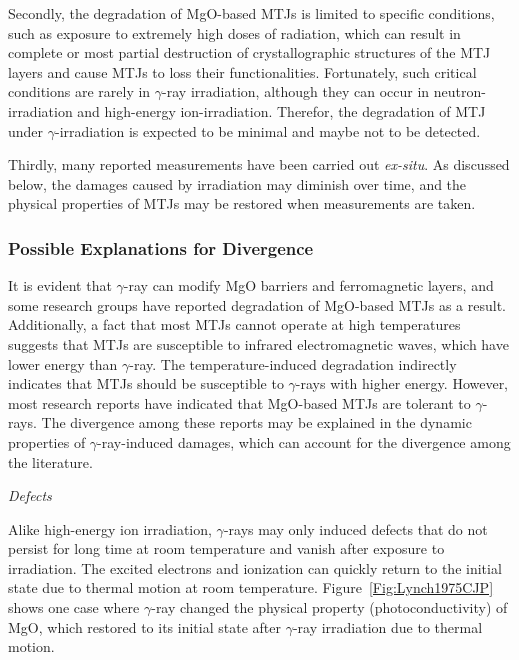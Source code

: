 \documentclass[molecules,review,submit,pdftex,moreauthors]{Definitions/mdpi}
\begin{document}
Secondly, the degradation of MgO-based MTJs is limited to specific conditions, such as exposure to extremely high doses of radiation, which can result in complete or most partial destruction of crystallographic structures of the MTJ layers and cause MTJs to loss their functionalities.  Fortunately, such critical conditions are rarely in $\gamma$-ray irradiation, although they can occur in neutron-irradiation and high-energy ion-irradiation.  Therefor, the degradation of MTJ under $\gamma$-irradiation is expected to be minimal and maybe not to be detected.


Thirdly, many reported measurements have been carried out \textit{ex-situ}.  As discussed below, the damages caused by irradiation may diminish over time, and the physical properties of MTJs may be restored when measurements are taken.  


\subsubsection{Possible Explanations for Divergence}


It is evident that $\gamma$-ray can modify MgO barriers and ferromagnetic layers, and some research groups have reported degradation of MgO-based MTJs as a result.  Additionally, a fact that most MTJs cannot operate at high temperatures suggests that MTJs are susceptible to infrared electromagnetic waves, which have lower energy than $\gamma$-ray.  The temperature-induced degradation indirectly indicates that MTJs should be susceptible to $\gamma$-rays with higher energy.  However, most research reports have indicated that MgO-based MTJs are tolerant to $\gamma$-rays.  The divergence among these reports may be explained in the dynamic properties of $\gamma$-ray-induced damages, which can account for the divergence among the literature.     


\vspace{12pt}
\noindent \emph{ Defects}
\vspace{6pt}


Alike high-energy ion irradiation, $\gamma$-rays may only induced  defects that do not persist for long time at room temperature and vanish after exposure to irradiation.  The excited electrons and ionization can quickly return to the initial state due to thermal motion at room temperature.  Figure~\ref{Fig:Lynch1975CJP} shows one case where $\gamma$-ray changed the physical property (photoconductivity) of MgO, which restored to its initial state after $\gamma$-ray irradiation due to thermal motion.  
\end{document}
